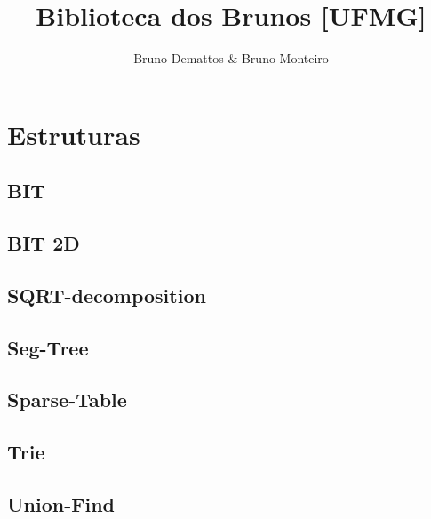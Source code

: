 \documentclass[12pt, a4paper, twoside]{article}
\title{Biblioteca dos Brunos [UFMG]}
\author{Bruno Demattos \& Bruno Monteiro}
\begin{document}
\twocolumn
\date{} %
\maketitle


\renewcommand{\contentsname}{Índice} %
\tableofcontents





%
%

\section{Estruturas}

\subsection{BIT}


\subsection{BIT 2D}


\subsection{SQRT-decomposition}


\subsection{Seg-Tree}


\subsection{Sparse-Table}


\subsection{Trie}


\subsection{Union-Find}

\end{document}
